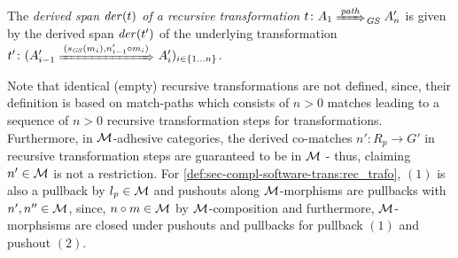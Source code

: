 \begin{definition}
\begin{center}
\end{center}
The \emph{derived span $\mathit{der}(t)$ of a recursive transformation $t\colon A_1 \Trans{\paths}_\GS A'_n$} is given by the derived span $\mathit{der}(t')$ of the underlying transformation $t'\colon(A'_{i-1} \Trans{(s_\GS(m_i),n'_{i-1} \circ m_i)} A'_i)_{i \in \{1\ldots n\}}$.
\envEndMarker
\end{definition}

\begin{remark}
\label{rem:sec-compl_software-trans:rec_trafo}
Note that identical (empty) recursive transformations are not defined, since, their definition is based on match-paths which consists of $n>0$ matches leading to a sequence of $n>0$ recursive transformation steps for transformations.
Furthermore, in ${\cal M}$-adhesive categories, the derived co-matches $n'\colon R_p \to G'$ in recursive transformation steps are guaranteed to be in ${\cal M}$ - thus, claiming $n' \in {\cal M}$ is not a restriction.
For \cref{def:sec-compl-software-trans:rec_trafo}, $(1)$ is also a pullback by $l_p \in {\cal M}$ and pushouts along ${\cal M}$-morphisms are pullbacks with $n',n'' \in {\cal M}$, since, $n \circ m \in {\cal M}$ by ${\cal M}$-composition and furthermore, ${\cal M}$-morphsisms are closed under pushouts and pullbacks for pullback $(1)$ and pushout $(2)$.
\envEndMarker
\end{remark}

